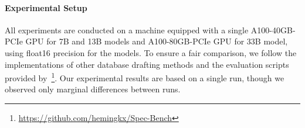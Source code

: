 


\paragraph{Experimental Setup}
All experiments are conducted on a machine equipped with a single A100-40GB-PCIe GPU for 7B and 13B models and A100-80GB-PCIe GPU for 33B model, using float16 precision for the models. To ensure a fair comparison, we follow the implementations of other database drafting methods and the evaluation scripts provided by~\citet{Spec_Survey}\footnote{\scriptsize \url{https://github.com/hemingkx/Spec-Bench}}. Our experimental results are based on a single run, though we observed only marginal differences between runs.